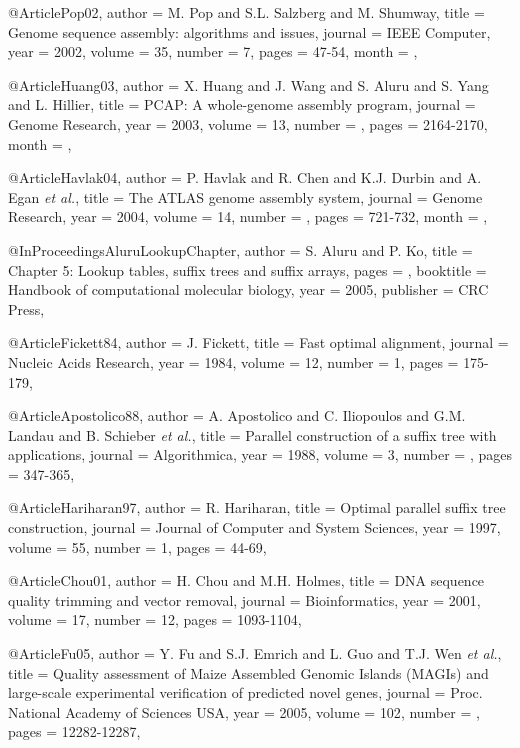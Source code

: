 @Article{Pop02,
  author =   {M. Pop and S.L. Salzberg and M. Shumway},
  title =    {{Genome sequence assembly: algorithms and issues}},
  journal =  {IEEE Computer},
  year =     {2002},
  volume =   {35},
  number =   {7},
  pages =    {47-54},
  month =    {},
}

@Article{Huang03,
  author =   {X. Huang and J. Wang and S. Aluru and S. Yang and L. Hillier},
  title =    {{PCAP: A whole-genome assembly program}},
  journal =  {Genome Research},
  year =     {2003},
  volume =   {13},
  number =   {},
  pages =    {2164-2170},
  month =    {},
}

@Article{Havlak04,
  author =   {P. Havlak and R. Chen and K.J. Durbin and A. Egan {\it et al.}},
  title =    {{The ATLAS genome assembly system}},
  journal =  {Genome Research},
  year =     {2004},
  volume =   {14},
  number =   {},
  pages =    {721-732},
  month =    {},
}

@InProceedings{AluruLookupChapter,
  author =       {S. Aluru and P. Ko},
  title =  {{Chapter 5: Lookup tables, suffix trees and suffix arrays}},
  pages =        {},
  booktitle =    {Handbook of computational molecular biology},
  year =         {2005},
  publisher =    {CRC Press},
}

@Article{Fickett84,
  author = {J. Fickett},
  title =  {Fast optimal alignment},
  journal = {Nucleic Acids Research},
  year = {1984},
  volume =  {12},
  number =  {1},
  pages =   {175-179},
}

@Article{Apostolico88,
  author = {A. Apostolico and C. Iliopoulos and G.M. Landau and B. Schieber {\it et al.}},
  title =  {Parallel construction of a suffix tree with applications},
  journal = {Algorithmica},
  year = {1988},
  volume =  {3},
  number =  {},
  pages =   {347-365},
}

@Article{Hariharan97,
  author = {R. Hariharan},
  title =  {Optimal parallel suffix tree construction},
  journal = {Journal of Computer and System Sciences},
  year = {1997},
  volume =  {55},
  number =  {1},
  pages =   {44-69},
}

@Article{Chou01,
  author = {H. Chou and M.H. Holmes},
  title =  {{DNA sequence quality trimming and vector removal}},
  journal = {Bioinformatics},
  year =    {2001},
  volume =  {17},
  number =  {12},
  pages =   {1093-1104},
}


@Article{Fu05,
  author = {Y. Fu and S.J. Emrich and L. Guo and T.J. Wen {\it et al.}},
  title =  {{Quality assessment of Maize Assembled Genomic Islands (MAGIs) and large-scale experimental verification of predicted novel genes}},
  journal = {Proc. National Academy of Sciences USA},
  year = {2005},
  volume =  {102},
  number =  {},
  pages =   {12282-12287},
}

